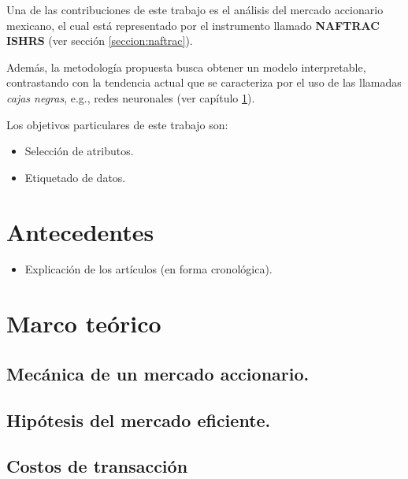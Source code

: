 \documentclass[onesided, 12pt]{scrbook}
\theoremstyle{break}
\begin{document}
Una de las contribuciones de este trabajo es el análisis del mercado accionario mexicano, el cual está representado por el instrumento llamado \textbf{NAFTRAC ISHRS} (ver sección \ref{seccion:naftrac}).

Además, la metodología propuesta busca obtener un modelo interpretable, contrastando con la tendencia actual que se caracteriza por el uso de las llamadas \textit{cajas negras}, e.g., redes neuronales (ver capítulo \ref{capitulo:antecedentes}).

Los objetivos particulares de este trabajo son:
\begin{itemize}
\item Selección de atributos.

\item Etiquetado de datos.
\end{itemize}




\chapter{Antecedentes}
\label{capitulo:antecedentes}
\begin{itemize}
\item Explicación de los artículos (en forma cronológica).
\end{itemize}

\chapter{Marco teórico}
\label{capitulo:marco teorico}

\section{Mecánica de un mercado accionario.}
\label{seccion:mecanica del mercado}

\section{Hipótesis del mercado eficiente.}
\label{seccion:hipotesis mercado eficiente}

\section{Costos de transacción}
\label{seccion:costos de transaccion}
\end{document}
